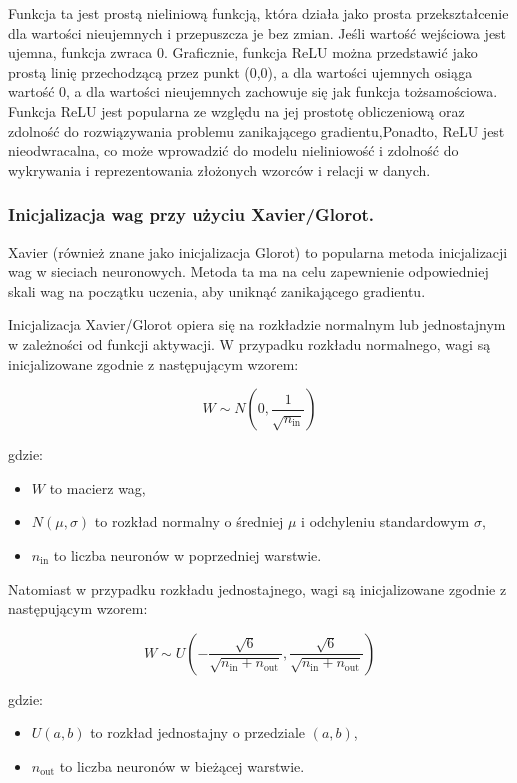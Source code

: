 \documentclass[12pt,twoside]{article}
\begin{document}
Funkcja ta jest prostą nieliniową funkcją, która działa jako prosta przekształcenie dla wartości nieujemnych i przepuszcza je bez zmian. Jeśli wartość wejściowa jest ujemna, funkcja zwraca 0. 
Graficznie, funkcja ReLU można przedstawić jako prostą linię przechodzącą przez punkt (0,0), a dla wartości ujemnych osiąga wartość 0, a dla wartości nieujemnych zachowuje się jak funkcja tożsamościowa.
Funkcja ReLU jest popularna ze względu na jej prostotę obliczeniową oraz zdolność do rozwiązywania problemu zanikającego gradientu,Ponadto, ReLU jest nieodwracalna, co może wprowadzić do modelu nieliniowość i zdolność do wykrywania i reprezentowania złożonych wzorców i relacji w danych.


\subsubsection{Inicjalizacja wag przy użyciu Xavier/Glorot.}

Xavier (również znane jako inicjalizacja Glorot) to popularna metoda inicjalizacji wag w sieciach neuronowych. Metoda ta ma na celu zapewnienie odpowiedniej skali wag na początku uczenia, aby uniknąć zanikającego gradientu.

Inicjalizacja Xavier/Glorot opiera się na rozkładzie normalnym lub jednostajnym w zależności od funkcji aktywacji. W przypadku rozkładu normalnego, wagi są inicjalizowane zgodnie z następującym wzorem:

\[
W \sim N\left(0, \frac{1}{\sqrt{n_{\text{in}}}}\right)
\]

gdzie:
\begin{itemize}
  \item $W$ to macierz wag,
  \item $N(\mu, \sigma)$ to rozkład normalny o średniej $\mu$ i odchyleniu standardowym $\sigma$,
  \item $n_{\text{in}}$ to liczba neuronów w poprzedniej warstwie.
\end{itemize}

Natomiast w przypadku rozkładu jednostajnego, wagi są inicjalizowane zgodnie z następującym wzorem:

\[
W \sim U\left(-\frac{\sqrt{6}}{\sqrt{n_{\text{in}} + n_{\text{out}}}}, \frac{\sqrt{6}}{\sqrt{n_{\text{in}} + n_{\text{out}}}}\right)
\]

gdzie:
\begin{itemize}
  \item $U(a, b)$ to rozkład jednostajny o przedziale $(a, b)$,
  \item $n_{\text{out}}$ to liczba neuronów w bieżącej warstwie.
\end{itemize}
\end{document}
